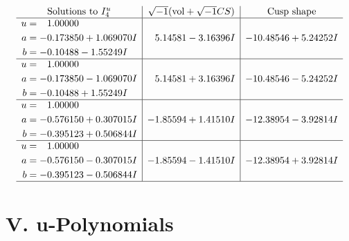 \documentclass[1p]{elsarticle_modified}
\theoremstyle{definition}
\newcommand{\I}{\sqrt{-1}}
\begin{document}
$$\begin{array}{c|c|c}  
\text{Solutions to }I^u_{4}& \I (\text{vol} + \sqrt{-1}CS) & \text{Cusp shape}\\
 \hline 
\begin{aligned}
u &= \phantom{-}1.00000\phantom{ +0.000000I} \\
a &= -0.173850 + 1.069070 I \\
b &= -0.10488 - 1.55249 I\end{aligned}
 & \phantom{-}5.14581 - 3.16396 I & -10.48546 + 5.24252 I \\ \hline\begin{aligned}
u &= \phantom{-}1.00000\phantom{ +0.000000I} \\
a &= -0.173850 - 1.069070 I \\
b &= -0.10488 + 1.55249 I\end{aligned}
 & \phantom{-}5.14581 + 3.16396 I & -10.48546 - 5.24252 I \\ \hline\begin{aligned}
u &= \phantom{-}1.00000\phantom{ +0.000000I} \\
a &= -0.576150 + 0.307015 I \\
b &= -0.395123 + 0.506844 I\end{aligned}
 & -1.85594 + 1.41510 I & -12.38954 - 3.92814 I \\ \hline\begin{aligned}
u &= \phantom{-}1.00000\phantom{ +0.000000I} \\
a &= -0.576150 - 0.307015 I \\
b &= -0.395123 - 0.506844 I\end{aligned}
 & -1.85594 - 1.41510 I & -12.38954 + 3.92814 I\\
 \hline 
 \end{array}$$\newpage
\newpage\renewcommand{\arraystretch}{1}
\centering \section*{ V. u-Polynomials}
\end{document}
